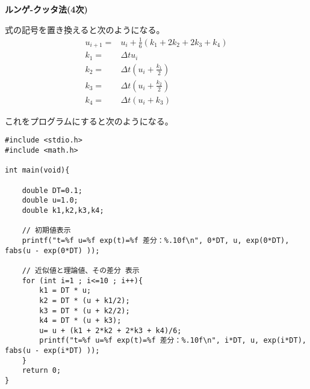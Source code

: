 \documentclass[12pt,b5paper]{ltjsarticle}
\begin{document}
\dotfill
\textbf{ルンゲ-クッタ法(4次)}
\dotfill

式の記号を置き換えると次のようになる。
\begin{align}
 u_{i+1} =& u_{i} + \frac{1}{6}(k_1+2k_2+2k_3+k_4)\\
 k_1 =& \Delta t u_{i}\\
 k_2 =& \Delta t \left( u_{i}+\frac{k_1}{2} \right)\\
 k_3 =& \Delta t \left( u_{i}+\frac{k_2}{2} \right)\\
 k_4 =& \Delta t (u_{i}+k_3)
\end{align}

これをプログラムにすると次のようになる。

\begin{lstlisting}
#include <stdio.h>
#include <math.h>

int main(void){

    double DT=0.1;
    double u=1.0;
    double k1,k2,k3,k4;

    // 初期値表示
    printf("t=%f u=%f exp(t)=%f 差分：%.10f\n", 0*DT, u, exp(0*DT), fabs(u - exp(0*DT) ));

    // 近似値と理論値、その差分 表示
    for (int i=1 ; i<=10 ; i++){
        k1 = DT * u;
        k2 = DT * (u + k1/2);
        k3 = DT * (u + k2/2);
        k4 = DT * (u + k3);
        u= u + (k1 + 2*k2 + 2*k3 + k4)/6;
        printf("t=%f u=%f exp(t)=%f 差分：%.10f\n", i*DT, u, exp(i*DT), fabs(u - exp(i*DT) ));
    }
    return 0;
}
\end{lstlisting}
\end{document}
